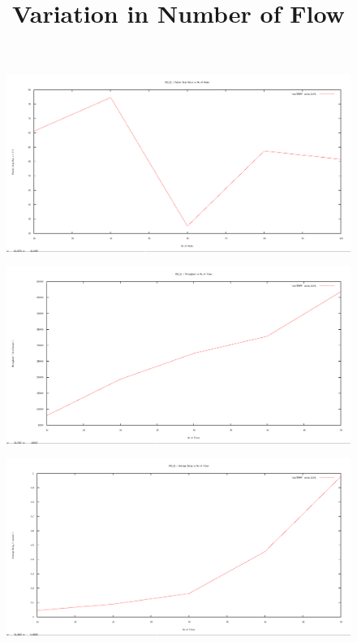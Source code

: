 \documentclass[12pt]{article}
\begin{document}
\begin{figure}[H]
	\centering
	\includegraphics[scale=	0.26]{image/802.11/Packetdropratio_vs_nodes.png}
\end{figure}


\newpage
\title{Variation in Number of Flow}
\begin{figure}[H]
	\centering
	\includegraphics[scale=	0.26]{image/802.11/Throughput_vs_flows.png}
\end{figure}

\begin{figure}[H]
	\centering
	\includegraphics[scale=	0.26]{image/802.11/Averagedelay_vs_flows.png}
\end{figure}
\end{document}
